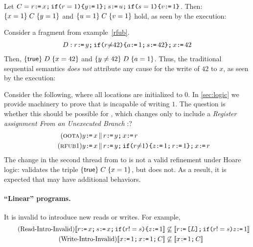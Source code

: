 Let $\aCmd = r \GETS x \SEMI \IF{r=1} \THEN y \GETS 1 \FI \SEMI s \GETS u \SEMI \IF{s=1} \THEN v \GETS 1 \FI$.  Then:
$ \hoare{x=1}{\aCmd}{y=1}$ and
$ \hoare{u=1}{\aCmd}{v=1}$
hold, as seen by the execution:
\begin{tikzdisplay}[node distance=1em]
\end{tikzdisplay}


Consider a fragment from example~\eqref{rfub}.
\begin{align*}
\bCmd:  r \GETS y \SEMI \IF{r \NOTEQ 42} \THEN a \GETS 1 \SEMI s \GETS 42 \FI \SEMI x \GETS 42
\end{align*}
Then, $\hoare{\TRUE}{\bCmd}{x=42} $ and $\hoare{y \neq 42}{\bCmd}{a= 1} $.  Thus, the traditional sequential semantics {\em does not} attribute any cause for the write of $42$ to $x$, as seen by the execution:
\begin{tikzdisplay}[node distance=1em]
\end{tikzdisplay}
Consider the
following, where all locations are initialized to $0$.  In \textsection\ref{sec:logic} we provide machinery to prove that \oota{} is
incapable of writing $1$.  The question is whether this should be possible
for \rfub, which changes \oota{} only to include a \emph{Register assignment
  From an Unexecuted Branch} \cite{BoehmOOTA}:?  
\begin{align*}
  \label{oota}  \tag{\textsc{oota}}
  y\GETS x
  \PAR&
  r\GETS y\SEMI
  x\GETS r
  \\
  \tag{\rfub1}
  \label{rfub}
  y\GETS x
  \PAR&
  r\GETS y\SEMI
  \IF{r \NOTEQ 1} \THEN z\GETS 1\SEMI r\GETS 1\FI  \SEMI x\GETS r 
\end{align*}
The change in the second
thread from \oota{} to \rfub{} is not a valid refinement under Hoare logic:
\rfub{} validates the triple $\hoare{\TRUE}{\aCmd}{x=1}$, but \oota{} does
not.  As a result, it is expected that \rfub{} may have additional behaviors.


\paragraph{``Linear'' programs.}

It is invalid to introduce new reads or writes.  For example, 
\begin{align*}
    \tag{Read-Intro-Invalid}
\sem{\aReg \GETS \aLoc \SEMI \bReg \GETS \aLoc  \SEMI 
\IF{\aReg != \bReg} \THEN \cLoc \GETS 1} &\not\subseteq
  \sem{\aReg \GETS \REF{\cExp} \SEMI \IF{\aReg != \bReg} \cLoc \GETS 1} \\
    \tag{Write-Intro-Invalid}
\sem{\aLoc \GETS 1 \SEMI \aLoc \GETS 1 \SEMI \aCmd} &\not\subseteq
  \sem{\aLoc \GETS 1 \SEMI \aCmd} \\
\end{align*}

